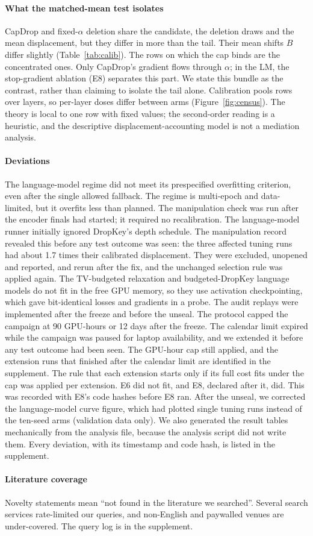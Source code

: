 \paragraph{What the matched-mean test isolates}
CapDrop and fixed-$\alpha$ deletion share the candidate, the deletion draws and the mean displacement, but they
differ in more than the tail. Their mean shifts $B$ differ slightly (Table~\ref{tab:calib}). The rows on which the cap
binds are the concentrated ones. Only CapDrop's gradient flows through $\alpha$; in the LM, the stop-gradient ablation (E8) separates this part. We state this bundle as the
contrast, rather than claiming to isolate the tail alone. Calibration pools rows over layers, so per-layer doses
differ between arms (Figure~\ref{fig:census}). The theory is local to one row with fixed values; the second-order
reading is a heuristic, and the descriptive displacement-accounting model is not a mediation analysis.

\paragraph{Deviations}
The language-model regime did not meet its prespecified overfitting criterion, even after the single
allowed fallback. The regime is multi-epoch and data-limited, but it overfits less than planned. The manipulation check was
run after the encoder finals had started; it required no recalibration. The language-model runner initially ignored
DropKey's depth schedule. The manipulation record revealed this before any test outcome was seen: the three affected
tuning runs had about 1.7 times their calibrated displacement. They were excluded, unopened and reported, and rerun
after the fix, and the unchanged selection rule was applied again. The TV-budgeted relaxation and budgeted-DropKey
language models do not fit in the free GPU memory, so they use activation checkpointing, which gave bit-identical
losses and gradients in a probe. The audit replays were implemented after the freeze and before the unseal. The protocol capped the campaign at 90
GPU-hours or 12 days after the freeze. The calendar limit expired while the campaign was paused for laptop availability,
and we extended it before any test outcome had been seen. The GPU-hour cap still applied, and the extension runs that
finished after the calendar limit are identified in the supplement. The rule that each extension starts only if its full cost fits under the cap was applied per extension. E6 did not fit, and
E8, declared after it, did. This was recorded with E8's code hashes before E8 ran. After the unseal, we corrected the
language-model curve figure, which had plotted single tuning runs instead of the ten-seed arms (validation data
only). We also generated the result tables mechanically from the analysis file, because the analysis script did not write them.
Every deviation, with its timestamp and code hash, is listed in the supplement.

\paragraph{Literature coverage}
Novelty statements mean ``not found in the literature we searched''. Several search services rate-limited our
queries, and non-English and paywalled venues are under-covered. The query log is in the supplement.
